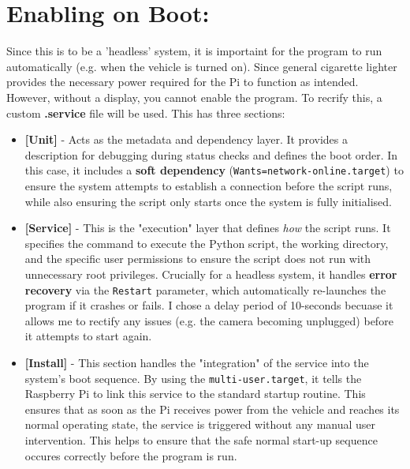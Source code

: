 \section{Enabling on Boot:}
Since this is to be a 'headless' system, it is importaint for the program to run automatically (e.g. when the vehicle is turned on). Since general cigarette lighter
provides the necessary power required for the Pi to function as intended. However, without a display, you cannot
enable the program.
To recrify this, a custom \textbf{.service} file will be used. This has three sections:
\begin{itemize}
    \item \textbf{[Unit]} - Acts as the metadata and dependency layer. It provides a description for debugging during status checks and defines the boot order. In this case, it
    includes a \textbf{soft dependency} (\texttt{Wants=network-online.target}) to ensure the system attempts to establish a connection before the script runs, while also ensuring
    the script only starts once the system is fully initialised.
    
    \item \textbf{[Service]} - This is the "execution" layer that defines \textit{how} the script runs. It specifies the command to execute the Python script, the working directory,
    and the specific user permissions to ensure the script does not run with unnecessary root privileges. Crucially for a headless system, it handles
    \textbf{error recovery} via the \texttt{Restart} parameter, which automatically re-launches the program if it crashes or fails. I chose a delay period of 10-seconds becuase
    it allows me to rectify any issues (e.g. the camera becoming unplugged) before it attempts to start again.
    
    \item \textbf{[Install]} - This section handles the "integration" of the service into the system's boot sequence. By using the \texttt{multi-user.target}, it tells the Raspberry
    Pi to link this service to the standard startup routine. This ensures that as soon as the Pi receives power from the vehicle and reaches its normal operating state, the service
    is triggered without any manual user intervention. This helps to ensure that the safe normal start-up sequence occures correctly before the program is run.
\end{itemize}